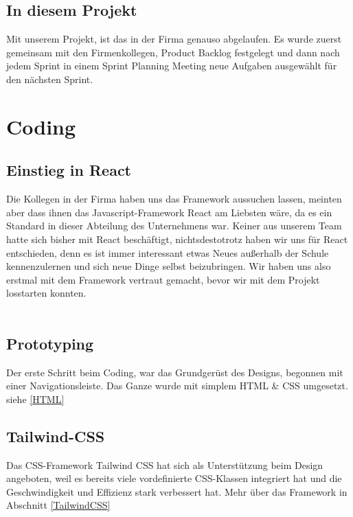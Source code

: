 \subsection*{In diesem Projekt}
Mit unserem Projekt, ist das in der Firma genauso abgelaufen. 
Es wurde zuerst gemeinsam mit den Firmenkollegen, Product Backlog festgelegt und dann nach jedem
Sprint in einem Sprint Planning Meeting neue Aufgaben ausgewählt für den nächsten Sprint. 
\cite{APCW20019}

\newpage
\section{Coding}
\subsection{Einstieg in React}
Die Kollegen in der Firma haben uns das Framework aussuchen lassen, meinten aber dass ihnen das Javascript-Framework React am Liebsten wäre, da
es ein Standard in dieser Abteilung des Unternehmens war. Keiner aus unserem Team hatte sich bisher mit React beschäftigt, nichtsdestotrotz
haben wir uns für React entschieden, denn es ist immer interessant etwas Neues außerhalb der Schule kennenzulernen und sich neue Dinge
selbst beizubringen. Wir haben uns also erstmal mit dem Framework vertraut gemacht, bevor wir mit dem Projekt losstarten konnten.
\\
\\
\subsection{Prototyping}
Der erste Schritt beim Coding, war das Grundgerüst des Designs, begonnen mit einer Navigationsleiste. Das Ganze wurde 
mit simplem HTML \& CSS umgesetzt. siehe \ref{HTML}


\subsection*{Tailwind-CSS}
Das CSS-Framework Tailwind CSS hat sich als Unterstützung beim Design angeboten, weil es bereits viele vordefinierte CSS-Klassen
integriert hat und die Geschwindigkeit und Effizienz stark verbessert hat. Mehr über das Framework in Abschnitt \ref{TailwindCSS}
\newpage
